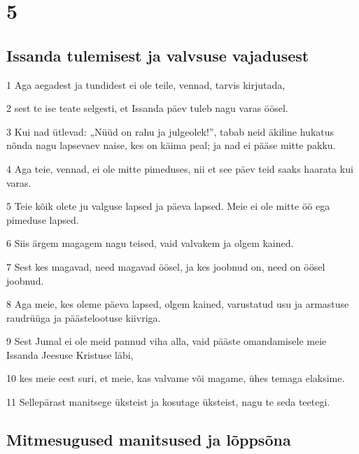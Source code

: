 \chapter{5}

\section*{Issanda tulemisest ja valvsuse vajadusest}

\par 1 Aga aegadest ja tundidest ei ole teile, vennad, tarvis kirjutada,
\par 2 sest te ise teate selgesti, et Issanda päev tuleb nagu varas öösel.
\par 3 Kui nad ütlevad: „Nüüd on rahu ja julgeolek!”, tabab neid äkiline hukatus nõnda nagu lapsevaev naise, kes on käima peal; ja nad ei pääse mitte pakku.
\par 4 Aga teie, vennad, ei ole mitte pimeduses, nii et see päev teid saaks haarata kui varas.
\par 5 Teie kõik olete ju valguse lapsed ja päeva lapsed. Meie ei ole mitte öö ega pimeduse lapsed.
\par 6 Siis ärgem magagem nagu teised, vaid valvakem ja olgem kained.
\par 7 Sest kes magavad, need magavad öösel, ja kes joobnud on, need on öösel joobnud.
\par 8 Aga meie, kes oleme päeva lapsed, olgem kained, varustatud usu ja armastuse raudrüüga ja päästelootuse kiivriga.
\par 9 Sest Jumal ei ole meid pannud viha alla, vaid pääste omandamisele meie Issanda Jeesuse Kristuse läbi,
\par 10 kes meie eest suri, et meie, kas valvame või magame, ühes temaga elaksime.
\par 11 Sellepärast manitsege üksteist ja kosutage üksteist, nagu te seda teetegi.

\section*{Mitmesugused manitsused ja lõppsõna}

